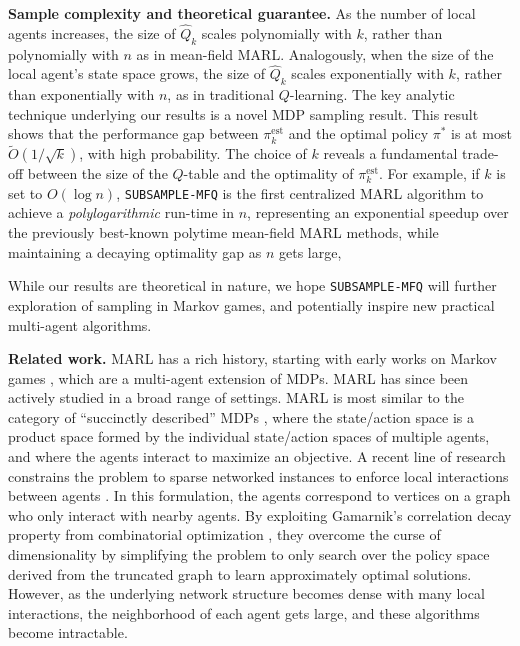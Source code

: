 \documentclass{article}
\theoremstyle{plain}
\theoremstyle{definition}
\def\est{\mathrm{est}}
\begin{document}
\textbf{Sample complexity and theoretical guarantee.} As the number of local agents increases, the size of $\hat{Q}_{k}$ scales polynomially with $k$, rather than polynomially with $n$ as in mean-field MARL. Analogously, when the size of the local agent's state space grows, the size of $\hat{Q}_{k}$ scales exponentially with $k$, rather than exponentially with $n$, as in traditional $Q$-learning. The key analytic technique underlying our results is a novel MDP sampling result. This result shows that the performance gap between ${{\pi}_{k}^\est}$ and the optimal policy ${ \pi^*}$ is at most $\tilde{O}(1/\sqrt{k})$, with high probability. The choice of $k$ reveals a fundamental trade-off between the size of the $Q$-table and the optimality of ${\pi}_{k}^\est$. For example, if $k$ is set to $O(\log n)$, \texttt{SUBSAMPLE-MFQ} is the first centralized MARL algorithm to achieve a \emph{polylogarithmic} run-time in $n$, representing an exponential speedup over the previously best-known polytime mean-field MARL methods, while maintaining a decaying optimality gap as $n$ gets large,
 

While our results are theoretical in nature, we hope \texttt{SUBSAMPLE-MFQ} will further exploration of sampling in Markov games, and potentially inspire new practical multi-agent algorithms.

\textbf{Related work.} MARL has a rich history, starting with early works on Markov games \citep{littman,Sutton_McAllester_Singh_Mansour_1999}, which are a multi-agent extension of MDPs. MARL has since been actively studied \citep{zhang2021multiagent} in a broad range of settings. MARL is most similar to the category of “succinctly described” MDPs \citep{Blondel_Tsitsiklis_2000}, where the state/action space is a product space formed by the individual state/action spaces of multiple agents, and where the agents interact to maximize an objective. A recent line of research constrains the problem to sparse networked instances to enforce local interactions between agents \citep{10.5555/3495724.3495899,DBLP:journals/corr/abs-2006-06555,10.5555/3586589.3586718}. In this formulation, the agents correspond to vertices on a graph who only interact with nearby agents. By exploiting Gamarnik's correlation decay property from combinatorial optimization \citep{gamarnik2009correlation}, they overcome the curse of dimensionality by simplifying the problem to only search over the policy space derived from the truncated graph to learn approximately optimal solutions. However, as the underlying network structure becomes dense with many local interactions, the neighborhood of each agent gets large, and these algorithms become intractable.
\end{document}
